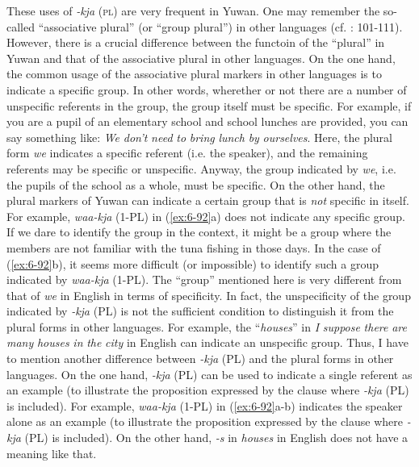 \begin{table}
  These uses of \textit{-kja} (\textsc{pl}) are very frequent in Yuwan. One may remember the so-called “associative plural” (or “group plural”) in other languages (cf. \citealt{Corbett2000}: 101-111). However, there is a crucial difference between the functoin of the “plural” in Yuwan and that of the associative plural in other languages. On the one hand, the common usage of the associative plural markers in other languages is to indicate a specific group. In other words, wherether or not there are a number of unspecific referents in the group, the group itself must be specific. For example, if you are a pupil of an elementary school and school lunches are provided, you can say something like: \textit{We} \textit{don’t} \textit{need} \textit{to} \textit{bring} \textit{lunch} \textit{by} \textit{ourselves}. Here, the plural form \textit{we} indicates a specific referent (i.e. the speaker), and the remaining referents may be specific or unspecific. Anyway, the group indicated by \textit{we}, i.e. the pupils of the school as a whole, must be specific. On the other hand, the plural markers of Yuwan can indicate a certain group that is \textit{not} specific in itself. For example, \textit{waa-kja} (1-PL) in (\ref{ex:6-92}a) does not indicate any specific group. If we dare to identify the group in the context, it might be a group where the members are not familiar with the tuna fishing in those days. In the case of (\ref{ex:6-92}b), it seems more difficult (or impossible) to identify such a group indicated by \textit{waa-kja} (1-PL). The “group” mentioned here is very different from that of \textit{we} in English in terms of specificity. In fact, the unspecificity of the group indicated by \textit{-kja} (PL) is not the sufficient condition to distinguish it from the plural forms in other languages. For example, the “\textit{houses}” in \textit{I} \textit{suppose} \textit{there} \textit{are} \textit{many} \textit{houses} \textit{in} \textit{the} \textit{city} in English can indicate an unspecific group. Thus, I have to mention another difference between \textit{-kja} (PL) and the plural forms in other languages. On the one hand, \textit{-kja} (PL) can be used to indicate a single referent as an example (to illustrate the proposition expressed by the clause where \textit{-kja} (PL) is included). For example, \textit{waa-kja} (1-PL) in (\ref{ex:6-92}a-b) indicates the speaker alone as an example (to illustrate the proposition expressed by the clause where \textit{-kja} (PL) is included). On the other hand, \textit{-s} in \textit{houses} in English does not have a meaning like that.


\end{table}
